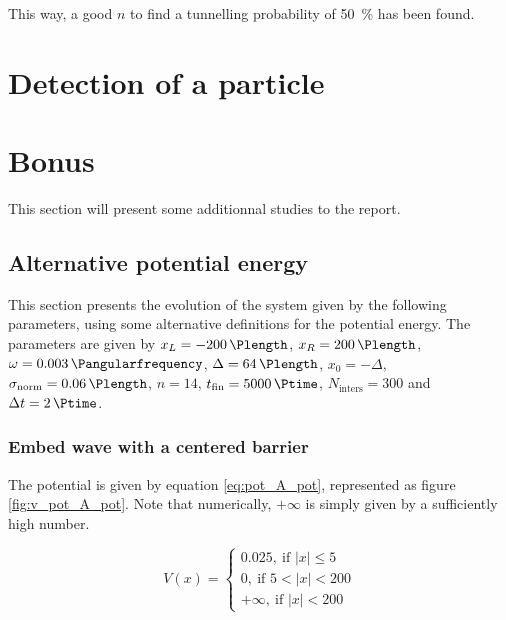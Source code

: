 \documentclass[a4paper,12pt,twoside]{article}
\begin{document}
      This way, a good $n$ to find a tunnelling probability of \SI{50}{\percent} has been found.


\newpage
\section{Detection of a particle}


\newpage
\section{Bonus}
  This section will present some additionnal studies to the report.\\

  \subsection{Alternative potential energy}
    This section presents the evolution of the system given by the following parameters, using some alternative definitions for the potential energy.
    The parameters are given by $x_L=\SI{-200}{\Plength}$, $x_R=\SI{200}{\Plength}$, $\omega = \SI{0.003}{\Pangularfrequency}$, $\Delta = \SI{64}{\Plength}$, $x_0 = -\Delta$, $\sigma_\text{norm} = \SI{0.06}{\Plength}$, $n=14$, $t_\text{fin} = \SI{5000}{\Ptime}$, $N_\text{inters} = 300$ and $\Delta t = \SI{2}{\Ptime}$.\\

      \subsubsection{Embed wave with a centered barrier}
        The potential is given by equation \eqref{eq:pot_A_pot}, represented as figure \ref{fig:v_pot_A_pot}.
        Note that numerically, $+\infty$ is simply given by a sufficiently high number.

        \begin{equation}
          V(x) =
          \begin{cases}
            0.025,~\text{if $|x| \leq 5$}\\
            0,~\text{if $5 < |x| < 200$}\\
            +\infty,~\text{if $|x| < 200$}
          \end{cases}
          \label{eq:pot_A_pot}
        \end{equation}
\end{document}
